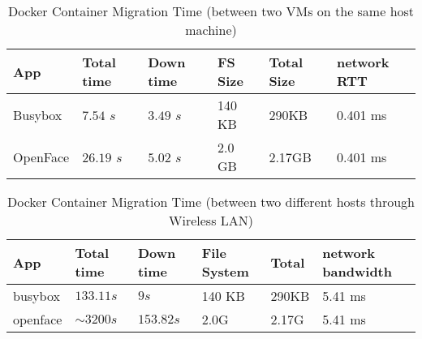 

\begin{table}[!t]
\centering
\begin{tabular}{|M{1.2cm}|M{0.9cm}|M{0.9cm}|M{1.4cm}|M{1.1cm}|M{0.9cm}|}
\hline
App & {Total  time}  & {Down time} & { FS Size } & { Total Size } & { network RTT } \\ \hline 
Busybox & $7.54$ $s$ & $3.49$ $s$ & 140 KB & 290KB &  0.401 ms \\\hline
OpenFace & $26.19$ $s$ & $5.02$ $s$ & 2.0 GB & 2.17GB &  0.401 ms \\\hline
\end{tabular}

\caption{Docker Container Migration Time (between two VMs on the same host machine)}
\label{table_samehost}

\end{table}

\begin{table}[!t]
\centering
\begin{tabular}{|M{1.2cm}|M{0.9cm}|M{0.9cm}|M{1.4cm}|M{1.1cm}|M{0.9cm}|}
\hline
App & Total time  & Down time &  File System & Total & network bandwidth \\ \hline 
busybox & $133.11 s$ & $9 s$ & 140 KB & 290KB & 5.41 ms\\\hline
openface & $\sim3200s$ & $153.82s$ & 2.0G & 2.17G & 5.41 ms\\\hline
\end{tabular}

\caption{Docker Container Migration Time (between two different hosts through Wireless LAN)}
\label{table_wireless}

\end{table}

